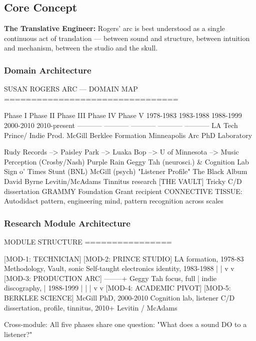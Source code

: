 \documentclass[11pt,letterpaper]{article}
\begin{document}
\subsection{Core Concept}

\textbf{The Translative Engineer:} Rogers' arc is best understood as a single continuous act of translation --- between sound and structure, between intuition and mechanism, between the studio and the skull.

\subsubsection{Domain Architecture}

\begin{asciibox}
SUSAN ROGERS ARC --- DOMAIN MAP
================================

Phase I          Phase II         Phase III        Phase IV         Phase V
1978-1983        1983-1988        1988-1999        2000-2010        2010-present
-----------      -----------      -----------      -----------      -----------
LA Tech          Prince/          Indie Prod.      McGill           Berklee
Formation        Minneapolis      Arc              PhD              Laboratory

Rudy Records --> Paisley Park --> Luaka Bop --> U of Minnesota --> Music Perception
(Crosby/Nash)    Purple Rain      Geggy Tah       (neurosci.)       & Cognition Lab
                 Sign o' Times    Stunt (BNL)     McGill (psych)    "Listener Profile"
                 The Black Album  David Byrne      Levitin/McAdams   Tinnitus research
                 [THE VAULT]      Tricky           C/D dissertation  GRAMMY Foundation
                                                                     Grant recipient
CONNECTIVE TISSUE: Autodidact pattern, engineering mind, pattern recognition across scales
\end{asciibox}

\subsubsection{Research Module Architecture}

\begin{asciibox}
MODULE STRUCTURE
================

  [MOD-1: TECHNICIAN]     [MOD-2: PRINCE STUDIO]
  LA formation, 1978-83   Methodology, Vault, sonic
  Self-taught electronics identity, 1983-1988
         |                        |
         v                        v
  [MOD-3: PRODUCTION ARC] --------+
  Geggy Tah focus, full            |
  indie discography,               |
  1988-1999                        |
         |                        |
         v                        v
  [MOD-4: ACADEMIC PIVOT] [MOD-5: BERKLEE SCIENCE]
  McGill PhD, 2000-2010   Cognition lab, listener
  C/D dissertation,       profile, tinnitus, 2010+
  Levitin / McAdams

  Cross-module: All five phases share one question:
  "What does a sound DO to a listener?"
\end{asciibox}
\end{document}

